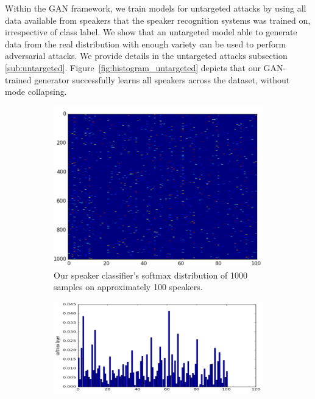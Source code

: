 Within the GAN framework, we train models for untargeted attacks by using all
data available from speakers that the speaker recognition systems was trained on, 
irrespective of class label. We show that an untargeted model able to generate 
data from the real distribution with enough variety can be used to perform 
adversarial attacks. We provide details in the untargeted attacks 
subsection \ref{sub:untargeted}. Figure~\ref{fig:histogram_untargeted} depicts
that our GAN-trained generator successfully learns all speakers across the
dataset, without mode collapsing.
\begin{figure}[t]
    \centering
    \begin{subfigure}[b]{0.4\textwidth}
        \includegraphics[width=\textwidth]{./fig/conf_mat_untargeted.png}
        \caption{Our speaker classifier's softmax distribution of 1000 samples 
        on approximately 100 speakers.}
        \label{fig:cm_untargeted}
    \end{subfigure}
    \qquad
    \begin{subfigure}[b]{0.4\textwidth}
        \includegraphics[width=\textwidth]{./fig/histogram_untargeted.png}

\end{subfigure}
\end{figure}
